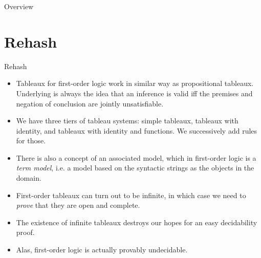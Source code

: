 \setcounter{framenumber}{346}
\begin{frame}
  \maketitle
\end{frame}

\begin{frame}{Overview}
\tableofcontents
\end{frame}

\section{Rehash}
\begin{frame}{Rehash}
	
\begin{itemize}
	
		\item Tableaux for first-order logic work in similar
                  way as propositional tableaux. Underlying is always
                  the idea that an inference is valid iff the premises
                  and negation of conclusion are jointly
                  unsatisfiable.
                  
		\item We have three tiers of tableau systems: simple
                  tableaux, tableaux with identity, and tableaux with
                  identity and functions. We successively add
                  rules for those.
		
		\item There is also a concept of an associated model,
                  which in first-order logic is a \emph{term model},
                  i.e. a model based on the syntactic strings as the
                  objects in the domain.
		
		\item First-order tableaux can turn out to be
                  infinite, in which case we need to \emph{prove} that
                  they are open and complete.
		
		\item The existence of infinite tableaux destroys our
                  hopes for an easy decidability proof.
		
		\item Alas, first-order logic is actually provably
                  undecidable.
		
					
\end{itemize}

\end{frame}
		


